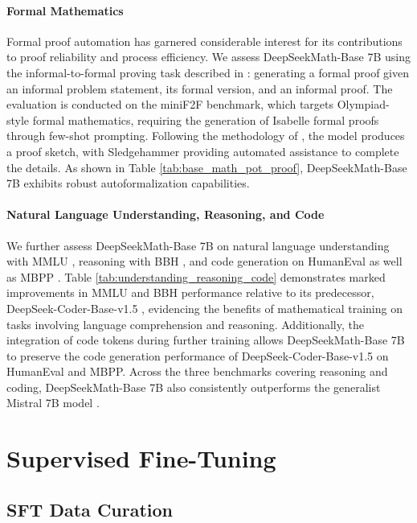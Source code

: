 \paragraph{Formal Mathematics}

Formal proof automation has garnered considerable interest for its contributions to proof reliability and process efficiency. We assess DeepSeekMath-Base 7B using the informal-to-formal proving task described in \citep{dsp_proof}: generating a formal proof given an informal problem statement, its formal version, and an informal proof. The evaluation is conducted on the miniF2F \citep{minif2f} benchmark, which targets Olympiad-style formal mathematics, requiring the generation of Isabelle formal proofs through few-shot prompting. Following the methodology of \cite{dsp_proof}, the model produces a proof sketch, with Sledgehammer \citep{sledgehammer} providing automated assistance to complete the details. As shown in Table \ref{tab:base_math_pot_proof}, DeepSeekMath-Base 7B exhibits robust autoformalization capabilities.

\paragraph{Natural Language Understanding, Reasoning, and Code}

We further assess DeepSeekMath-Base 7B on natural language understanding with MMLU \citep{mmlu}, reasoning with BBH \citep{bbh}, and code generation on HumanEval \citep{codex} as well as MBPP \citep{mbpp}. Table \ref{tab:understanding_reasoning_code} demonstrates marked improvements in MMLU and BBH performance relative to its predecessor, DeepSeek-Coder-Base-v1.5 \citep{deepseek-coder}, evidencing the benefits of mathematical training on tasks involving language comprehension and reasoning. Additionally, the integration of code tokens during further training allows DeepSeekMath-Base 7B to preserve the code generation performance of DeepSeek-Coder-Base-v1.5 on HumanEval and MBPP. Across the three benchmarks covering reasoning and coding, DeepSeekMath-Base 7B also consistently outperforms the generalist Mistral 7B model \citep{mistral}.

\section{Supervised Fine-Tuning}

\subsection{SFT Data Curation}

